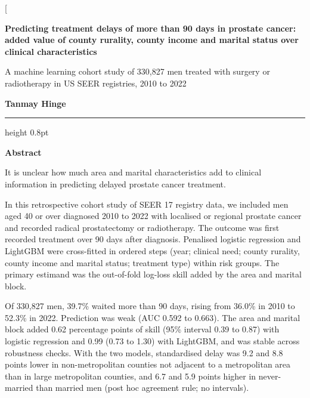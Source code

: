 \documentclass[10pt,a4paper,twocolumn]{article}
\begin{document}
\twocolumn[{%
\thispagestyle{firstpage}

\vspace{12pt}
{\raggedright\sffamily\bfseries\fontsize{19}{23}\selectfont Predicting treatment delays of more than 90 days in prostate cancer: added value of county rurality, county income and marital status over clinical characteristics\par}
\vspace{5pt}
{\raggedright\sffamily\large\color{black!70} A machine learning cohort study of 330,827 men treated with surgery or radiotherapy in US SEER registries, 2010 to 2022\par}
\vspace{9pt}
{\raggedright\sffamily\bfseries Tanmay Hinge\par}
\vspace{9pt}
{\color{accent}\hrule height 0.8pt}
\vspace{9pt}
\noindent
\begin{minipage}[t]{0.645\textwidth}
\setlength{\parskip}{4pt}\small
{\sffamily\bfseries\normalsize\color{accent} Abstract\par}
 It is unclear how much area and marital characteristics add to clinical information in predicting delayed prostate cancer treatment.

 In this retrospective cohort study of SEER 17 registry data, we included men aged 40 or over diagnosed 2010 to 2022 with localised or regional prostate cancer and recorded radical prostatectomy or radiotherapy. The outcome was first recorded treatment over 90 days after diagnosis. Penalised logistic regression and LightGBM were cross-fitted in ordered steps (year; clinical need; county rurality, county income and marital status; treatment type) within risk groups. The primary estimand was the out-of-fold log-loss skill added by the area and marital block.

 Of 330,827 men, 39.7\% waited more than 90 days, rising from 36.0\% in 2010 to 52.3\% in 2022. Prediction was weak (AUC 0.592 to 0.663). The area and marital block added 0.62 percentage points of skill (95\% interval 0.39 to 0.87) with logistic regression and 0.99 (0.73 to 1.30) with LightGBM, and was stable across robustness checks. With the two models, standardised delay was 9.2 and 8.8 points lower in non-metropolitan counties not adjacent to a metropolitan area than in large metropolitan counties, and 6.7 and 5.9 points higher in never-married than married men (post hoc agreement rule; no intervals).


\end{minipage}}
\end{document}
